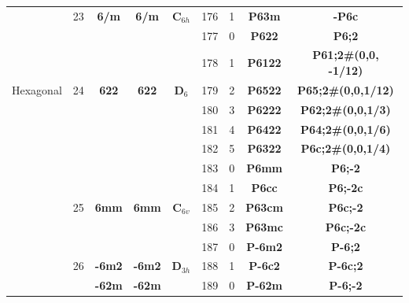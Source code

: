 \documentclass{article}      %
\begin{document}
\begin{small}
\begin{longtable}[c]{|c|c|c|c|c|c|c|c|c|}
  & \textrm{23} &\textbf{6/m} &\textbf{6/m} &$\mathbf{C}_{6h}$ &\textrm{176}  &\textrm{1} &\textbf{P63m}         &\textbf{-P6c}\\\cline{2-9}         
          & & & & &\textrm{177} &\textrm{0} &\textbf{P622}         &\textbf{P6;2}\\\cline{6-9}         
          & & & & &\textrm{178} &\textrm{1} &\textbf{P6122}       &\textbf{P61;2#(0,0, -1/12)}\\\cline{6-9}
 \textrm{Hexagonal} & \textrm{24} &\textbf{622} &\textbf{622} &$\mathbf{D}_6$ &\textrm{179} &\textrm{2} &\textbf{P6522}       &\textbf{P65;2#(0,0,1/12)}\\\cline{6-9} 
          & & & & &\textrm{180} &\textrm{3} &\textbf{P6222}       &\textbf{P62;2#(0,0,1/3)}\\\cline{6-9}  
          & & & & &\textrm{181} &\textrm{4} &\textbf{P6422}       &\textbf{P64;2#(0,0,1/6)}\\\cline{6-9}  
          & & & & &\textrm{182} &\textrm{5} &\textbf{P6322}       &\textbf{P6c;2#(0,0,1/4)}\\\cline{2-9}  
          & & & & &\textrm{183}  &\textrm{0} &\textbf{P6mm}         &\textbf{P6;-2}\\\cline{6-9}        
          & & & & &\textrm{184}  &\textrm{1} &\textbf{P6cc}         &\textbf{P6;-2c}\\\cline{6-9}       
 & \textrm{25} &\textbf{6mm} &\textbf{6mm} &$\mathbf{C}_{6v}$  &\textrm{185}  &\textrm{2} &\textbf{P63cm}       &\textbf{P6c;-2}\\\cline{6-9}        
          & & & & &\textrm{186}  &\textrm{3} &\textbf{P63mc}       &\textbf{P6c;-2c}\\\cline{2-9}       
          & & & & &\textrm{187}  &\textrm{0} &\textbf{P-6m2}       &\textbf{P-6;2}\\\cline{6-9}         
	  &\textrm{26}  &\textbf{-6m2}  &\textbf{-6m2} &$\mathbf{D}_{3h}$ &\textrm{188}  &\textrm{1} &\textbf{P-6c2} &\textbf{P-6c;2}\\\cline{3-4}\cline{6-9} 
          & &\textbf{-62m} &\textbf{-62m} & &\textrm{189}  &\textrm{0} &\textbf{P-62m}       &\textbf{P-6;-2}\\\cline{6-9}        

\end{longtable}
\end{small}
\end{document}
